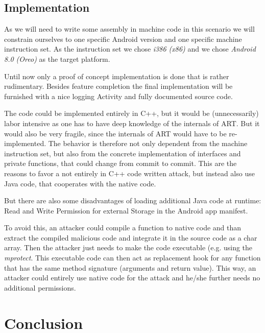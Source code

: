 \subsection{Implementation}

As we will need to write some assembly in machine code in this scenario we will 
constrain ourselves to one specific Android version and one specific machine instruction set. As the instruction set we  chose \emph{i386 (x86)} and 
we chose \emph{Android 8.0 (Oreo)} as the target platform.

Until now only a proof of concept implementation is done that is rather rudimentary. 
Besides feature completion the final implementation will be furnished with a nice logging Activity and fully documented source code. 

The code could be implemented entirely in C++, but it would be (unnecessarily) labor intensive as one has to have deep knowledge of the internals of ART. But it would also be very fragile, since the internals of ART would have to be re-implemented. The behavior is therefore not only dependent from  the machine instruction set, but also from the concrete implementation of interfaces and private functions, that could change from commit to commit.
This are the reasons to favor a not entirely in C++ code written attack, but instead also use Java code, that cooperates with the native code.

But there are also some disadvantages of loading additional Java code at runtime: Read and Write Permission for external Storage in the Android app manifest. 

 To avoid this, an attacker could compile a function to native code and than extract the compiled malicious code and integrate it in the source code as a char array. Then the attacker just needs to make the code executable (e.g. using the \textit{mprotect}. This executable code can then act as replacement hook for any function that has the same method signature (arguments and return value).
 This way, an attacker could entirely use native code for the attack and he/she further needs no additional permissions.
\section{Conclusion}